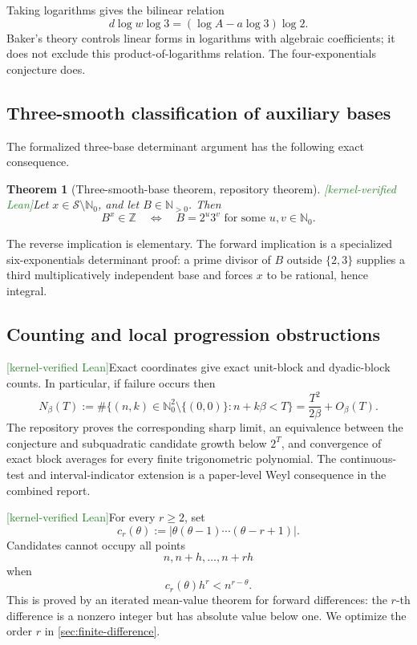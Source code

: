 \documentclass[11pt,oneside]{article}
\newtheorem{theorem}{Theorem}[section]
\theoremstyle{definition}
\newcommand{\N}{\mathbb N}
\newcommand{\Nzero}{\mathbb N_0}
\newcommand{\Z}{\mathbb Z}
\newcommand{\Sol}{\mathcal S}
\newcommand{\tagLean}{\textcolor{ForestGreen}{\textsf{[kernel-verified Lean]}}}
\begin{document}
Taking logarithms gives the bilinear relation
\begin{equation}\label{eq:bilinear-logs}
  d\log w\log3=(\log A-a\log3)\log2.
\end{equation}
Baker's theory controls linear forms in logarithms with algebraic coefficients; it does not
exclude this product-of-logarithms relation.  The four-exponentials conjecture does.

\subsection{Three-smooth classification of auxiliary bases}

The formalized three-base determinant argument has the following exact consequence.

\begin{theorem}[Three-smooth-base theorem, repository theorem]\label{thm:three-smooth}
\tagLean Let \(x\in\Sol\setminus\Nzero\), and let \(B\in\N_{>0}\).  Then
\[
  B^x\in\Z
  \quad\Longleftrightarrow\quad
  B=2^u3^v\text{ for some }u,v\in\Nzero.
\]
\end{theorem}

The reverse implication is elementary.  The forward implication is a specialized
six-exponentials determinant proof: a prime divisor of \(B\) outside \(\{2,3\}\) supplies
a third multiplicatively independent base and forces \(x\) to be rational, hence integral.

\subsection{Counting and local progression obstructions}

\tagLean Exact coordinates give exact unit-block and dyadic-block counts.  In particular,
if failure occurs then
\begin{equation}\label{eq:total-asymptotic}
  N_\beta(T):=
  \#\{(n,k)\in\Nzero^2\setminus\{(0,0)\}:n+k\beta<T\}
  =\frac{T^2}{2\beta}+O_\beta(T).
\end{equation}
The repository proves the corresponding sharp limit, an equivalence between the conjecture
and subquadratic candidate growth below \(2^T\), and convergence of exact block averages
for every finite trigonometric polynomial.  The continuous-test and interval-indicator
extension is a paper-level Weyl consequence in the combined report.

\tagLean For every \(r\ge2\), set
\[
  c_r(\theta):=
  \left|\theta(\theta-1)\cdots(\theta-r+1)\right|.
\]
Candidates cannot occupy all points
\[
  n,n+h,\ldots,n+rh
\]
when
\begin{equation}\label{eq:higher-difference-condition}
  c_r(\theta)h^r<n^{r-\theta}.
\end{equation}
This is proved by an iterated mean-value theorem for forward differences: the \(r\)-th
difference is a nonzero integer but has absolute value below one.  We optimize the order
\(r\) in \cref{sec:finite-difference}.
\end{document}
